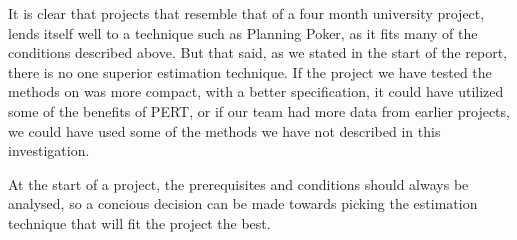 It is clear that projects that resemble that of a four month university project, lends itself well to a technique such as Planning Poker, as it fits many of the conditions described above. But that said, as we stated in the start of the report, there is no one superior estimation technique. If the project we have tested the methods on was more compact, with a better specification, it could have utilized some of the benefits of PERT, or if our team had more data from earlier projects, we could have used some of the methods we have not described in this investigation. 

At the start of a project, the prerequisites and conditions should always be analysed, so a concious decision can be made towards picking the estimation technique that will fit the project the best.

